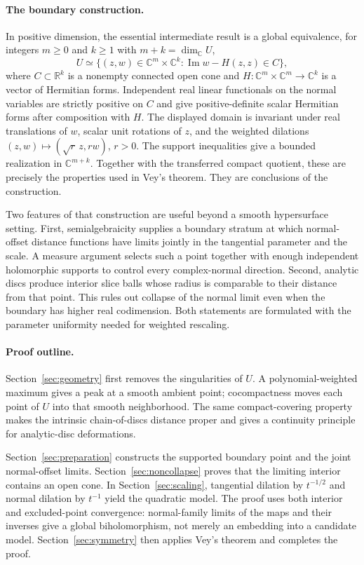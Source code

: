 \documentclass[11pt]{article}
\numberwithin{equation}{section}
\theoremstyle{definition}
\theoremstyle{remark}
\newcommand{\R}{\mathbb R}
\newcommand{\C}{\mathbb C}
\DeclareMathOperator{\Imop}{Im}
\begin{document}
\paragraph{The boundary construction.}
In positive dimension, the essential intermediate result is a global
equivalence, for integers \(m\geq0\) and \(k\geq1\) with
\(m+k=\dim_\C U\),
\[
 U\simeq
 \{(z,w)\in\C^m\times\C^k:
        \Imop w-H(z,z)\in C\},
\]
where \(C\subset\R^k\) is a nonempty connected open cone and
\(H:\C^m\times\C^m\to\C^k\) is a vector of Hermitian forms.
Independent real linear functionals on
the normal variables are strictly positive on \(C\) and give
positive-definite scalar Hermitian forms after composition with \(H\).
The displayed domain is invariant under real translations of \(w\),
scalar unit rotations of \(z\), and the weighted dilations
\((z,w)\mapsto(\sqrt r\,z,rw)\), \(r>0\).
The support inequalities give a bounded realization in \(\C^{m+k}\).
Together with the transferred compact quotient, these are precisely the
properties used in Vey's theorem. They are conclusions of the construction.

Two features of that construction are useful beyond a smooth
hypersurface setting. First, semialgebraicity supplies a boundary
stratum at which normal-offset distance functions have limits jointly
in the tangential parameter and the scale. A measure argument selects
such a point together with enough independent holomorphic supports to
control every complex-normal direction. Second, analytic discs produce
interior slice balls whose radius is comparable to their distance from
that point. This rules out collapse of the normal limit even when the
boundary has higher real codimension. Both statements are formulated
with the parameter uniformity needed for weighted rescaling.

\paragraph{Proof outline.}
Section~\ref{sec:geometry} first removes the singularities of \(U\).
A polynomial-weighted maximum gives a peak at a smooth ambient point;
cocompactness moves each point of \(U\) into that smooth
neighborhood. The same compact-covering property makes the intrinsic
chain-of-discs distance proper and gives a continuity principle for
analytic-disc deformations.

Section~\ref{sec:preparation} constructs the supported boundary point
and the joint normal-offset limits. Section~\ref{sec:noncollapse} proves
that the limiting interior contains an open cone. In
Section~\ref{sec:scaling}, tangential dilation by \(t^{-1/2}\) and normal
dilation by \(t^{-1}\) yield the quadratic model. The proof uses both
interior and excluded-point convergence: normal-family limits of the maps and
their inverses give a global biholomorphism, not merely an embedding
into a candidate model. Section~\ref{sec:symmetry} then applies Vey's
theorem and completes the proof.
\end{document}
